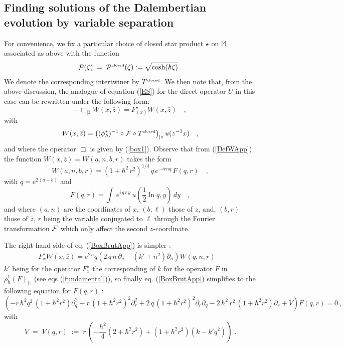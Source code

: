 \documentclass{article}
\newcommand{\MM}{\mathbb M}
\def\cp{{\cal P}}
\begin{document}
\subsection{Finding solutions of the Dalembertian evolution by variable separation} \label{SectSL}
For convenience, we fix a particular choice of closed star product $\star$ on $\MM$ associated as above with
the function 
\begin{equation}
\cp(\zeta)\;=\;\cp^{\mbox{\tiny{\rm closed}}}(\zeta):=\sqrt{\cosh(\hbar \zeta)}\;.
\end{equation}
We denote the corresponding intertwiner by $T^{{\mbox{\tiny{\rm closed}}}}$. We then note that, from the above discussion,  the analogue of equation (\ref{ES}) for the direct operator $U$ in this case can be rewritten under the following form:
\begin{equation}\label{BoxBrutApp}
- \Box_{|\bar{{  z}}} W({  x},\bar{{  z}}) = F^\star_{{ (x)}}
W({ x},\bar{{  z}}) \quad ,
\end{equation}
with
\begin{equation}\label{DefWApp}
W({  x},\bar{{  z}}) = \left( (\phi_\hbar ^*)^{-1} \circ {\cal F}
\circ T^{{\mbox{\tiny{\rm closed}}}} \right)_{|{  z}} u({ z}^{-1}{  x}) \quad ,
\end{equation}
and where  the operator $\Box$ is given by (\ref{box1}). 
Observe that from  (\ref{DefWApp})
 the function $W({
x},\bar{{z}}) = W(a,n,b,r)$ takes the form 
\begin{equation}\label{FormeW}
W  (a,n,b,r) =   (1+ \hbar^2 \,r^2)^{1/4} \, q
\, e^{-i  r  n  q} \, F (q,r) \quad,
\end{equation}
with $q =  e^{2(a-b)}$ and
\begin{equation}\label{uF}
F (q,r) = \int\, e^{i\,  q\,r\, y} \, u
(\frac{1}{2} \ln  q,y) \, dy \quad,
\end{equation}
and where $ (a,n)$ are the coordinates of $x$, $(b,\ell)$ those of $z$, and, 
$(b,r)$ those of $\bar z$, $r$ being the variable conjugated to $\ell$ through the
Fourier transformation  ${\cal F}$ which only affect the second
$z$-coordinate.

\noindent The right-hand side of eq. (\ref{BoxBrutApp}) is simpler  :
\begin{eqnarray}\label{BoxBox}
F^\star_{ x}W(x,\bar z)= e^{2\,a}q\left(2\,q\,n\,\partial_q-(k'+n^2)\partial_n\right) W(q,n,r)\quad 
\end{eqnarray}
$k'$ being for the operator $F^\star_{x}$ the corresponding of $k$ for the  operator $F$ in $\rho_\hbar ^1(F)_{|{  z}}$  (see eqs (\ref{fundamental})), so finally eq. (\ref{BoxBrutApp}) simplifies to the following equation for $F  (q,
r)$ :
\begin{equation}\label{BoxFqr}
\left(-r\,  \hbar^2 q^2\,(1+\hbar^2  r^2  ) \partial_q^2 - r\,(1+\hbar^2 r^2)^2 \partial_r^2  + 2\,q\,(1+\hbar^2 r^2)^2 \partial_r
\partial_q   - 2\,\hbar^2\,r^2\,(1+\hbar^2 r^2)  \partial_r +
V\right) F (q,r) = 0 \ ,
\end{equation}
with 
\begin{equation}
V\;=\;V(q,r)\;:=\;r\,(-\frac{\hbar^2}4 (2+\hbar^2 r^2 ) + (1+\hbar^2 r^2) (k - k' q^2))\;.
\end{equation}
\end{document}
